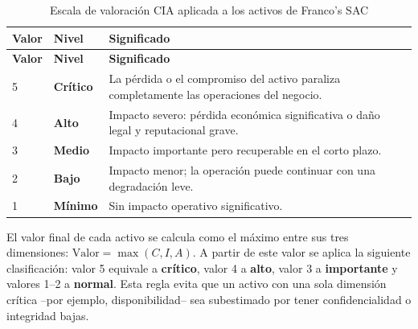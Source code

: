 \documentclass[11pt, a4paper, oneside]{report}
\begin{document}
\renewcommand{\arraystretch}{1.3}
\footnotesize
{}

\begin{xltabular}{\textwidth}{@{}|L{2.2cm}|L{2.4cm}|X|@{}}
\caption{Escala de valoración CIA aplicada a los activos de Franco's SAC}
\label{tab:escala_valoracion_cia} \\

\parbox[c][1.1cm][c]{\linewidth}{\centering\color{white}\bfseries\small Valor} &
\parbox[c][1.1cm][c]{\linewidth}{\centering\color{white}\bfseries\small Nivel} &
\parbox[c][1.1cm][c]{\linewidth}{\centering\color{white}\bfseries\small Significado} \\ \hline
\endfirsthead

\parbox[c][1.1cm][c]{\linewidth}{\centering\color{white}\bfseries\small Valor} &
\parbox[c][1.1cm][c]{\linewidth}{\centering\color{white}\bfseries\small Nivel} &
\parbox[c][1.1cm][c]{\linewidth}{\centering\color{white}\bfseries\small Significado} \\ \hline
\endhead

\hline
\endfoot

{\small 5} & {\small\textcolor{sev_critico}{\textbf{Crítico}}} & {\small La pérdida o el compromiso del activo paraliza completamente las operaciones del negocio.} \\ \hline
{\small 4} & {\small\textcolor{sev_alto}{\textbf{Alto}}} & {\small Impacto severo: pérdida económica significativa o daño legal y reputacional grave.} \\ \hline
{\small 3} & {\small\textcolor{sev_medio}{\textbf{Medio}}} & {\small Impacto importante pero recuperable en el corto plazo.} \\ \hline
{\small 2} & {\small\textcolor{sev_bajo}{\textbf{Bajo}}} & {\small Impacto menor; la operación puede continuar con una degradación leve.} \\ \hline
{\small 1} & {\small\textcolor{sev_normal}{\textbf{Mínimo}}} & {\small Sin impacto operativo significativo.} \\ \hline

\end{xltabular}

\normalsize

El valor final de cada activo se calcula como el máximo entre sus tres dimensiones: $\text{Valor} = \max(C, I, A)$. A partir de este valor se aplica la siguiente clasificación: valor 5 equivale a \textbf{crítico}, valor 4 a \textbf{alto}, valor 3 a \textbf{importante} y valores 1--2 a \textbf{normal}. Esta regla evita que un activo con una sola dimensión crítica --por ejemplo, disponibilidad-- sea subestimado por tener confidencialidad o integridad bajas.
\end{document}
